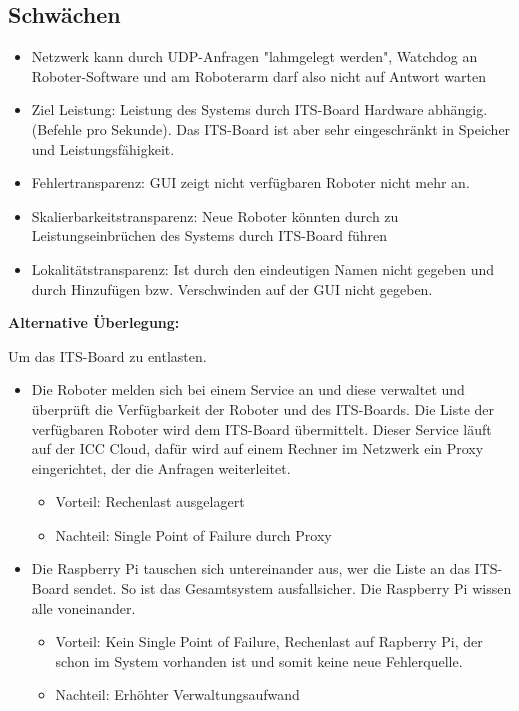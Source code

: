 \subsection*{Schwächen}
\begin{itemize}
	\item Netzwerk kann durch UDP-Anfragen "lahmgelegt werden", Watchdog an Roboter-Software und am Roboterarm darf also nicht auf Antwort warten
	\item Ziel Leistung: Leistung des Systems durch ITS-Board Hardware abhängig. (Befehle pro Sekunde). Das ITS-Board ist aber sehr eingeschränkt in Speicher und Leistungsfähigkeit.
	\item Fehlertransparenz: GUI zeigt nicht verfügbaren Roboter nicht mehr an.
	\item Skalierbarkeitstransparenz: Neue Roboter könnten durch zu Leistungseinbrüchen des Systems durch ITS-Board führen
	\item Lokalitätstransparenz: Ist durch den eindeutigen Namen nicht gegeben und durch Hinzufügen bzw. Verschwinden auf der GUI nicht gegeben.
\end{itemize}


\textbf{Alternative Überlegung:}

Um das ITS-Board zu entlasten.

\begin{itemize}
	\item Die Roboter melden sich bei einem Service an und diese verwaltet und überprüft die Verfügbarkeit der Roboter und des ITS-Boards. Die Liste der verfügbaren Roboter wird dem ITS-Board übermittelt. Dieser Service läuft auf der ICC Cloud, dafür wird auf einem Rechner im Netzwerk ein Proxy eingerichtet, der die Anfragen weiterleitet.
	\begin{itemize}
		\item Vorteil: Rechenlast ausgelagert
		\item Nachteil: Single Point of Failure durch Proxy
	\end{itemize}
	\item Die Raspberry Pi tauschen sich untereinander aus, wer die Liste an das ITS-Board sendet. So ist das Gesamtsystem ausfallsicher. Die Raspberry Pi wissen alle voneinander.
	\begin{itemize}
		\item Vorteil: Kein Single Point of Failure, Rechenlast auf Rapberry Pi, der schon im System vorhanden ist und somit keine neue Fehlerquelle.
		\item Nachteil: Erhöhter Verwaltungsaufwand
	\end{itemize}
\end{itemize}





